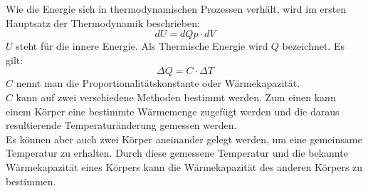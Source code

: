 \documentclass[12pt,a4paper,]{scrreprt}
\begin{document}
Wie die Energie sich in thermodynamischen Prozessen verhält, wird im ersten Hauptsatz der Thermodynamik beschrieben: \\
\begin{equation}
dU = dQ  p \cdot dV
\end{equation}
$U$ steht für die innere Energie. Als Thermische Energie wird $Q$ bezeichnet. Es gilt:\\
\begin{equation}
\Delta Q = C \cdot \Delta T 
\end{equation}
$C$ nennt man die Proportionalitätskonstante oder Wärmekapazität. \\
$C$ kann auf zwei verschiedene Methoden bestimmt werden.  Zum einen kann einem Körper eine bestimmte Wärmemenge zugefügt werden und die daraus resultierende Temperaturänderung gemessen werden.\\
Es können aber auch zwei Körper aneinander gelegt werden, um eine gemeinsame Temperatur zu erhalten. Durch diese gemessene Temperatur und die bekannte Wärmekapazität eines Körpers kann die Wärmekapazität des anderen Körpers zu bestimmen.
\pagebreak
\end{document}
